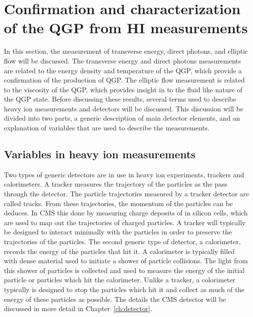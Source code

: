   \section{Confirmation and characterization of the QGP from HI measurements}
    In this section, the measurement of transverse energy, direct photons, and
      elliptic flow will be discussed.
    The transverse energy and direct photons measurements are related to 
      the energy density and temperature of the QGP, which provide a 
      confirmation of the production of QGP.
    The elliptic flow measurement is related to the viscosity of the QGP, which
      provides insight in to the fluid like nature of the QGP state.
    Before discussing these results, several terms used to describe heavy ion
      measurements and detectors will be discussed. 
    This discussion will be divided into two parts, a generic description of 
      main detector elements, and an explanation of variables that are used to 
      describe the measurements.
    
    \subsection{Variables in heavy ion measurements}
      Two types of generic detectors are in use in heavy ion experiments, 
        trackers and calorimeters. 
      A tracker measures the trajectory of the particles as the pass through 
        the detector.
      The particle trajectories measured by a tracker detector are called 
        tracks.
      From these trajectories, the momentum of the particles can be deduces. 
      In CMS this done by measuring charge deposits of in silicon cells, which 
        are used to map out the trajectories of charged particles.
      A tracker will typically be designed to interact minimally with the 
        particles in order to preserve the trajectories of the particles. 
      The second generic type of detector, a calorimeter, records the energy 
        of the particles that hit it. 
      A calorimeter is typically filled with dense material used to initiate a 
        shower of particle collisions.
      The light from this shower of particles is collected and used to measure 
        the energy of the initial particle or particles which hit the 
        calorimeter.
      Unlike a tracker, a colorimeter typically is designed to stop the particles
        which hit it and collect as much of the energy of these particles as 
        possible.
      The details the CMS detector will be discussed in more detail in 
       Chapter~\ref{ch:detector}.
  
